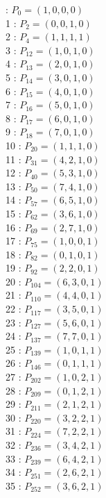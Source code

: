 \documentclass{article}
\begin{document}
{\begin{multicols}{3}
 : $P_{0}=( 1, 0, 0, 0 )$\\
1 : $P_{2}=( 0, 0, 1, 0 )$\\
2 : $P_{4}=( 1, 1, 1, 1 )$\\
3 : $P_{12}=( 1, 0, 1, 0 )$\\
4 : $P_{13}=( 2, 0, 1, 0 )$\\
5 : $P_{14}=( 3, 0, 1, 0 )$\\
6 : $P_{15}=( 4, 0, 1, 0 )$\\
7 : $P_{16}=( 5, 0, 1, 0 )$\\
8 : $P_{17}=( 6, 0, 1, 0 )$\\
9 : $P_{18}=( 7, 0, 1, 0 )$\\
10 : $P_{20}=( 1, 1, 1, 0 )$\\
11 : $P_{31}=( 4, 2, 1, 0 )$\\
12 : $P_{40}=( 5, 3, 1, 0 )$\\
13 : $P_{50}=( 7, 4, 1, 0 )$\\
14 : $P_{57}=( 6, 5, 1, 0 )$\\
15 : $P_{62}=( 3, 6, 1, 0 )$\\
16 : $P_{69}=( 2, 7, 1, 0 )$\\
17 : $P_{75}=( 1, 0, 0, 1 )$\\
18 : $P_{82}=( 0, 1, 0, 1 )$\\
19 : $P_{92}=( 2, 2, 0, 1 )$\\
20 : $P_{104}=( 6, 3, 0, 1 )$\\
21 : $P_{110}=( 4, 4, 0, 1 )$\\
22 : $P_{117}=( 3, 5, 0, 1 )$\\
23 : $P_{127}=( 5, 6, 0, 1 )$\\
24 : $P_{137}=( 7, 7, 0, 1 )$\\
25 : $P_{139}=( 1, 0, 1, 1 )$\\
26 : $P_{146}=( 0, 1, 1, 1 )$\\
27 : $P_{202}=( 1, 0, 2, 1 )$\\
28 : $P_{209}=( 0, 1, 2, 1 )$\\
29 : $P_{211}=( 2, 1, 2, 1 )$\\
30 : $P_{220}=( 3, 2, 2, 1 )$\\
31 : $P_{224}=( 7, 2, 2, 1 )$\\
32 : $P_{236}=( 3, 4, 2, 1 )$\\
33 : $P_{239}=( 6, 4, 2, 1 )$\\
34 : $P_{251}=( 2, 6, 2, 1 )$\\
35 : $P_{252}=( 3, 6, 2, 1 )$\\

\end{multicols}}
\end{document}
